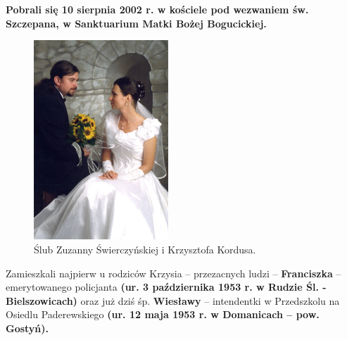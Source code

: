 \textbf{Pobrali się 10 sierpnia 2002 r. w kościele pod wezwaniem św. Szczepana, w Sanktuarium Matki Bożej Bogucickiej.}

\begin{figure}[!h]
\begin{center}
\includegraphics[width=0.45\textwidth]{photo/zuzia_krzysiek_kordus_slub.jpg}
\caption{Ślub Zuzanny Świerczyńskiej i Krzysztofa Kordusa.}
\end{center}
\end{figure}

Zamieszkali najpierw u rodziców Krzysia – przezacnych ludzi – \textbf{Franciszka} – emerytowanego policjanta \textbf{(ur. 3 października 1953 r. w Rudzie Śl. - Bielszowicach)} oraz już dziś śp. \textbf{Wiesławy} – intendentki w Przedszkolu na Osiedlu Paderewskiego \textbf{(ur. 12 maja 1953 r. w Domanicach – pow. Gostyń).}

